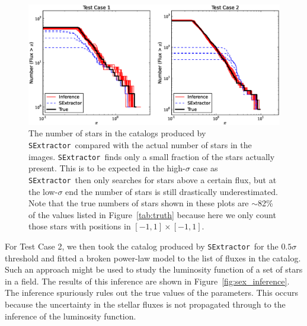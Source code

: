 \documentclass[12pt, preprint]{aastex}
\newcommand{\sex}{{\tt SExtractor}}
\begin{document}
\begin{figure}[ht!]
\begin{center}
\includegraphics[width=\textwidth]{Figures/luminosity_function.eps}
\end{center}
\caption{The number of stars in the catalogs produced by \sex~compared with the
actual number of stars in the images. \sex~finds only a small fraction of the
stars actually present. This is to be expected in the high-$\sigma$ case as
\sex~then only searches for stars above a certain flux, but at the low-$\sigma$
end the number of stars is still drastically underestimated. Note that the true
numbers
of stars shown in these plots are $\sim$82\% of the values listed in
Figure~\ref{tab:truth} because here we only count those stars with positions
in $[-1, 1] \times [-1, 1]$.
\label{fig:luminosity_function}}
\end{figure}

For Test Case 2, we then took the catalog produced by \sex~for the $0.5\sigma$
threshold and fitted a broken power-law model to the list of fluxes in the catalog.
Such an approach might be used to study the luminosity function of a set of stars
in a field. The results of this inference are shown in Figure~\ref{fig:sex_inference}.
The inference spuriously rules out the true values of the parameters. This
occurs because the uncertainty in the stellar fluxes is not propagated through
to the inference of the luminosity function.
\end{document}
